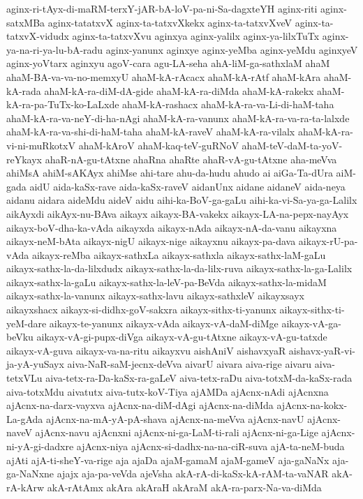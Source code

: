 {aginx-ri-tAyx-di-maRM-terxY-jAR-bA-loV-pa-ni-Sa-dagxteYH
aginx-riti
aginx-satxMBa
aginx-tatatxvX
aginx-ta-tatxvXkekx
aginx-ta-tatxvXveV
aginx-ta-tatxvX-vidudx
aginx-ta-tatxvXvu
aginxya
aginx-yalilx
aginx-ya-lilxTuTx
aginx-ya-na-ri-ya-lu-bA-radu
aginx-yanunx
aginxye
aginx-yeMba
aginx-yeMdu
aginxyeV
aginx-yoVtarx
aginxyu
agoV-cara
agu-LA-seha
ahA-liM-ga-sathxlaM
ahaM
ahaM-BA-va-va-no-memxyU
ahaM-kA-rAcacx
ahaM-kA-rAtf
ahaM-kAra
ahaM-kA-rada
ahaM-kA-ra-diM-dA-gide
ahaM-kA-ra-diMda
ahaM-kA-rakekx
ahaM-kA-ra-pa-TuTx-ko-LaLxde
ahaM-kA-rashacx
ahaM-kA-ra-va-Li-di-haM-taha
ahaM-kA-ra-va-neY-di-ha-nAgi
ahaM-kA-ra-vanunx
ahaM-kA-ra-va-ra-ta-lalxde
ahaM-kA-ra-va-shi-di-haM-taha
ahaM-kA-raveV
ahaM-kA-ra-vilalx
ahaM-kA-ra-vi-ni-muRkotxV
ahaM-kAroV
ahaM-kaq-teV-guRNoV
ahaM-teV-daM-ta-yoV-reYkayx
ahaR-nA-gu-tAtxne
ahaRna
ahaRte
ahaR-vA-gu-tAtxne
aha-meVva
ahiMsA
ahiM-sAKAyx
ahiMse
ahi-tare
ahu-da-hudu
ahudo
ai
aiGa-Ta-dUra
aiM-gada
aidU
aida-kaSx-rave
aida-kaSx-raveV
aidanUnx
aidane
aidaneV
aida-neya
aidanu
aidara
aideMdu
aideV
aidu
aihi-ka-BoV-ga-gaLu
aihi-ka-vi-Sa-ya-ga-Lalilx
aikAyxdi
aikAyx-nu-BAva
aikayx
aikayx-BA-vakekx
aikayx-LA-na-pepx-nayAyx
aikayx-boV-dha-ka-vAda
aikayxda
aikayx-nAda
aikayx-nA-da-vanu
aikayxna
aikayx-neM-bAta
aikayx-nigU
aikayx-nige
aikayxnu
aikayx-pa-dava
aikayx-rU-pa-vAda
aikayx-reMba
aikayx-sathxLa
aikayx-sathxla
aikayx-sathx-laM-gaLu
aikayx-sathx-la-da-lilxdudx
aikayx-sathx-la-da-lilx-ruva
aikayx-sathx-la-ga-Lalilx
aikayx-sathx-la-gaLu
aikayx-sathx-la-leV-pa-BeVda
aikayx-sathx-la-midaM
aikayx-sathx-la-vanunx
aikayx-sathx-lavu
aikayx-sathxleV
aikayxsayx
aikayxshacx
aikayx-si-didhx-goV-sakxra
aikayx-sithx-ti-yanunx
aikayx-sithx-ti-yeM-dare
aikayx-te-yanunx
aikayx-vAda
aikayx-vA-daM-diMge
aikayx-vA-ga-beVku
aikayx-vA-gi-pupx-diVga
aikayx-vA-gu-tAtxne
aikayx-vA-gu-tatxde
aikayx-vA-guva
aikayx-va-na-ritu
aikayxvu
aishAniV
aishavxyaR
aishavx-yaR-vi-ja-yA-yuSayx
aiva-NaR-saM-jecnx-deVva
aivarU
aivara
aiva-rige
aivaru
aiva-tetxVLu
aiva-tetx-ra-Da-kaSx-ra-gaLeV
aiva-tetx-raDu
aiva-totxM-da-kaSx-rada
aiva-totxMdu
aivatutx
aiva-tutx-koV-Tiya
ajAMDa
ajAcnx-nAdi
ajAcnxna
ajAcnx-na-darx-vayxva
ajAcnx-na-diM-dAgi
ajAcnx-na-diMda
ajAcnx-na-kokx-La-gAda
ajAcnx-na-mA-yA-pA-shava
ajAcnx-na-meVva
ajAcnx-navU
ajAcnx-naveV
ajAcnx-navu
ajAcnxni
ajAcnx-ni-ga-LaM-ti-rali
ajAcnx-ni-ga-Lige
ajAcnx-ni-yA-gi-dadxre
ajAcnx-niya
ajAcnx-si-dadhx-na-na-ciR-suva
ajA-ta-neM-buda
ajAti
ajA-ti-sheY-va-rige
aja
ajaDa
ajaM-gamaM
ajaM-gameV
aja-gaNaNx
aja-ga-NaNxne
ajajx
aja-pa-veVda
ajeVsha
akA-rA-di-kaSx-kA-rAM-ta-vaNAR
akA-rA-kArw
akA-rAtAmx
akAra
akAraH
akAraM
akA-ra-parx-Na-va-diMda
}
